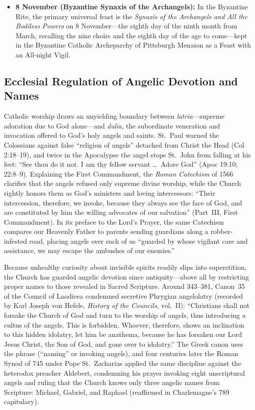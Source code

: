 \begin{itemize}
\item \textbf{8 November (Byzantine Synaxis of the Archangels):} In the Byzantine Rite, the primary universal feast is the \emph{Synaxis of the Archangels and All the Bodiless Powers} on 8 November---the eighth day of the ninth month from March, recalling the nine choirs and the eighth day of the age to come---kept in the Byzantine Catholic Archeparchy of Pittsburgh Menaion as a Feast with an All-night Vigil.
\end{itemize}

\subsection{Ecclesial Regulation of Angelic Devotion and Names}

Catholic worship draws an unyielding boundary between \emph{latria}---supreme adoration due to God alone---and \emph{dulia}, the subordinate veneration and invocation offered to God's holy angels and saints. St.~Paul warned the Colossians against false ``religion of angels'' detached from Christ the Head (Col 2:18--19), and twice in the Apocalypse the angel stops St.~John from falling at his feet: ``See thou do it not. I am thy fellow servant \dots\ Adore God'' (Apoc 19:10; 22:8--9). Explaining the First Commandment, the \emph{Roman Catechism} of 1566 clarifies that the angels refused only supreme divine worship, while the Church rightly honors them as God's ministers and loving intercessors: ``Their intercession, therefore, we invoke, because they always see the face of God, and are constituted by him the willing advocates of our salvation'' (Part~III, First Commandment). In its preface to the Lord's Prayer, the same Catechism compares our Heavenly Father to parents sending guardians along a robber-infested road, placing angels over each of us ``guarded by whose vigilant care and assistance, we may escape the ambushes of our enemies.''

Because unhealthy curiosity about invisible spirits readily slips into superstition, the Church has guarded angelic devotion since antiquity---above all by restricting proper names to those revealed in Sacred Scripture. Around 343--381, Canon~35 of the Council of Laodicea condemned secretive Phrygian angelolatry (recorded by Karl Joseph von Hefele, \emph{History of the Councils}, vol.~II): ``Christians shall not forsake the Church of God and turn to the worship of angels, thus introducing a cultus of the angels. This is forbidden. Whoever, therefore, shows an inclination to this hidden idolatry, let him be anathema, because he has forsaken our Lord Jesus Christ, the Son of God, and gone over to idolatry.'' The Greek canon uses the phrase  (``naming'' or invoking angels), and four centuries later the Roman Synod of 745 under Pope St.~Zacharias applied the same discipline against the heterodox preacher Aldebert, condemning his prayer invoking eight unscriptural angels and ruling that the Church knows only three angelic names from Scripture: Michael, Gabriel, and Raphael (reaffirmed in Charlemagne's 789 capitulary).

